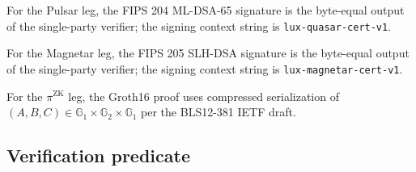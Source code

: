 For the Pulsar leg, the FIPS 204 ML-DSA-65 signature is the
byte-equal output of the single-party verifier; the signing context
string is \texttt{lux-quasar-cert-v1}.

For the Magnetar leg, the FIPS 205 SLH-DSA signature is the
byte-equal output of the single-party verifier; the signing context
string is \texttt{lux-magnetar-cert-v1}.

For the $\pi^{\mathrm{ZK}}$ leg, the Groth16 proof uses compressed
serialization of $(A, B, C) \in \mathbb{G}_1 \times \mathbb{G}_2
\times \mathbb{G}_1$ per the BLS12-381 IETF draft.

\subsection{Verification predicate}
\label{sec:verify}

